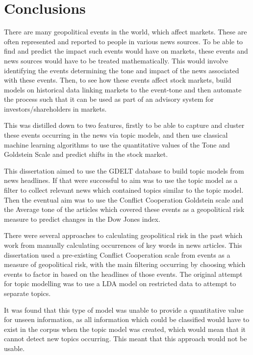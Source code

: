 \section{Conclusions}
\label{conclusions}
There are many geopolitical events in the world, which affect markets. These are often represented and reported to people in various news sources. To be able to find and predict the impact such events would have on markets, these events and news sources would have to be treated mathematically. This would involve identifying the events determining the tone and impact of the news associated with these events. Then, to see how these events affect stock markets, build models on historical data linking markets to the event-tone and then automate the process such that it can be used as part of an advisory system for investors/shareholders in markets. 

This was distilled down to two features, firstly to be able to capture and cluster these events occurring in the news via topic models, and then use classical machine learning algorithms to use the quantitative values of the Tone and Goldstein Scale and predict shifts in the stock market. 

This dissertation aimed to use the GDELT database to build topic models from news headlines. If that were successful to aim was to use the topic model as a filter to collect relevant news which contained topics similar to the topic model. Then the eventual aim was to use the Conflict Cooperation Goldstein scale and the Average tone of the articles which covered these events as a geopolitical risk measure to predict changes in the Dow Jones index. 

There were several approaches to calculating geopolitical risk in the past which work from manually calculating occurrences of key words in news articles. This dissertation used a pre-existing Conflict Cooperation scale from events as a measure of geopolitical risk, with the main filtering occurring by choosing which events to factor in based on the headlines of those events.  The original attempt for topic modelling was to use a LDA model on restricted data to attempt to separate topics.    

It was found that this type of model was unable to provide a quantitative value for unseen information, as all information which could be classified would have to exist in the corpus when the topic model was created, which would mean that it cannot detect new topics occurring. This meant that this approach would not be usable.

